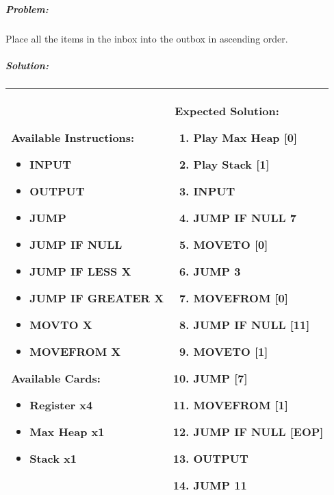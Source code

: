 \subparagraph{Problem:} Place all the items in the inbox into the outbox in ascending order.

\subparagraph{Solution:} 
\begin{center}
    \begin{tabular}{ | m{5cm} | m{9cm} | } 
        \hline
            \textbf{Available Instructions:} 
            \begin{itemize}
                \setlength\itemsep{-.35em}
                \item INPUT
                \item OUTPUT
                \item JUMP
                \item JUMP IF NULL
                \item JUMP IF LESS X
                \item JUMP IF GREATER X
                \item MOVTO X
                \item MOVEFROM X
            \end{itemize}
            \textbf{Available Cards:} 
            \begin{itemize}
                \setlength\itemsep{-.35em}
                \item Register x4
                \item Max Heap x1
                \item Stack x1
            \end{itemize}& 
            \textbf{Expected Solution:} 
            \begin{enumerate}
                \setlength\itemsep{-.35em}
                \item Play Max Heap [0]
                \item Play Stack [1]
                \item INPUT
                \item JUMP IF NULL 7
                \item MOVETO [0]
                \item JUMP 3
                \item MOVEFROM [0]
                \item JUMP IF NULL [11]
                \item MOVETO [1]
                \item JUMP [7]
                \item MOVEFROM [1]
                \item JUMP IF NULL [EOP]
                \item OUTPUT
                \item JUMP 11
            \end{enumerate}
            \\
        \hline
    \end{tabular}
\end{center}